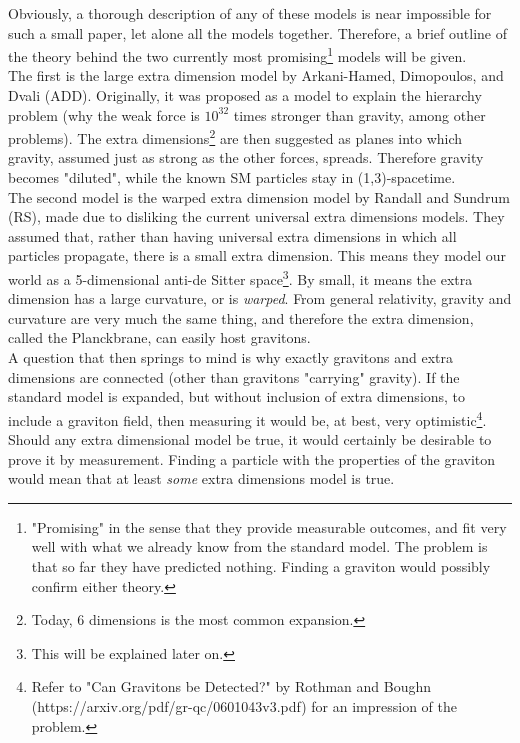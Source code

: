 \documentclass[11pt,a4paper]{article}
\begin{document}
Obviously, a thorough description of any of these models is near impossible for such a small paper, let alone all the models together. Therefore, a brief outline of the theory behind the two currently most promising\footnote{"Promising" in the sense that they provide measurable outcomes, and fit very well with what we already know from the standard model. The problem is that so far they have predicted nothing. Finding a graviton would possibly confirm either theory.} models will be given.\\
The first is the large extra dimension model by Arkani-Hamed, Dimopoulos, and Dvali (ADD). Originally, it was proposed as a model to explain the hierarchy problem (why the weak force is $10^{32}$ times stronger than gravity, among other problems). The extra dimensions\footnote{Today, 6 dimensions is the most common expansion.} are then suggested as planes into which gravity, assumed just as strong as the other forces, spreads. Therefore gravity becomes "diluted", while the known SM particles stay in (1,3)-spacetime.\\
The second model is the warped extra dimension model by Randall and Sundrum (RS), made due to disliking the current universal extra dimensions models. They assumed that, rather than having universal extra dimensions in which all particles propagate,  there is a small extra dimension. This means they model our world as a 5-dimensional anti-de Sitter space\footnote{This will be explained later on.}. By small, it means the extra dimension has a large curvature, or is \emph{warped}. From general relativity, gravity and curvature are very much the same thing, and therefore the extra dimension, called the Planckbrane, can easily host gravitons.\\
A question that then springs to mind is why exactly gravitons and extra dimensions are connected (other than gravitons "carrying" gravity). If the standard model is expanded, but without inclusion of extra dimensions, to include a graviton field, then measuring it would be, at best, very optimistic\footnote{Refer to "Can Gravitons be Detected?" by Rothman and Boughn (https://arxiv.org/pdf/gr-qc/0601043v3.pdf) for an impression of the problem.}.
Should any extra dimensional model be true, it would certainly be desirable to prove it by measurement. Finding a particle with the properties of the graviton would mean that at least \emph{some} extra dimensions model is true.
\end{document}
